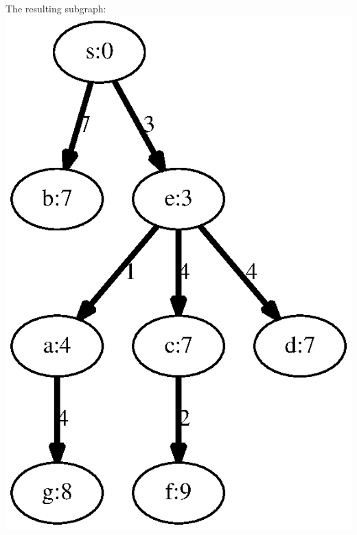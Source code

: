 \documentclass{article}
\begin{document}
\HR
\begin{minipage}[b][.25\textheight]{0.303030303030303\linewidth}
The resulting subgraph: 
\includegraphics[height=.25\textheight]{dijkstra_gross_yellen_09.eps}
\end{minipage}
\end{document}
